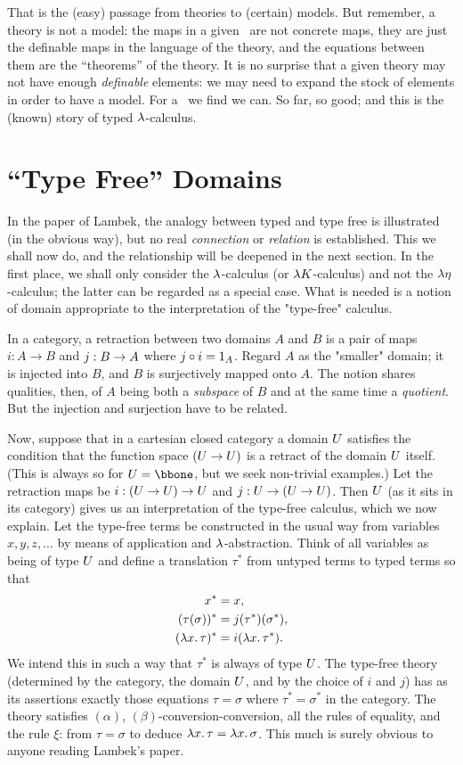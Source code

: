 That is the (easy) passage from theories to (certain) models.
But remember, a theory is not a model: the maps in a given
\ccc\ are not concrete maps, they are just the definable maps in the language of the theory, and the equations between them are the ``theorems'' of the theory. It is no surprise that a given theory may not have enough {\it definable} elements: we may need to expand the stock of elements in order to have a model. For a \ccc\ we find we can. So far, so good; and this is the (known) story of typed $\lambda$-calculus.

\section{``Type Free'' Domains}

In the paper of Lambek, the analogy between typed and type free is illustrated (in the obvious way), but no real {\it connection} or {\it relation} is established. This we shall now do, and the relationship will be deepened in the next section.
In the first place, we shall only consider the $\lambda$-calculus (or $\lambda K$-calculus) and not the $\lambda \eta$-calculus; the latter can be regarded as a special case. What is needed is a notion of domain appropriate to the interpretation of the "type-free" calculus.

In a category, a retraction between two domains $A$ and $B$ is a pair of maps $i: A	\to B$ and $j : B \rightarrow A$ where $j \circ i = {\textrm 1}_A$. Regard $A$ as the "smaller" domain; it is injected into $B$, and $B$ is surjectively mapped onto $A$. The notion shares qualities, then, of $A$ being both a {\it subspace} of $B$ and at the same time a {\it quotient}.
But the injection and surjection have to be related.

Now, suppose that in a cartesian closed category a domain $U$ satisfies the condition that the function space $(U\rightarrow U)$ is a retract of the domain $U$ itself. (This is always so for $\U = \bbone$, but we seek non-trivial examples.) Let the retraction maps be $i: (U \rightarrow U) \rightarrow U$ and $j : U \rightarrow (U \rightarrow U)$. Then $U$ (as it sits in its category) gives us an interpretation of the type-free calculus, which we now explain.
Let the type-free terms be constructed in the usual way from variables $x,y,z, \dots$ by means of application and $\lambda$-abstraction.
Think of all variables as being of type $U$ and define a translation $\tau^*$ from untyped terms to typed terms so that
\begin{align*}
x^* &= x, \\
(\tau(\sigma))^* &= j(\tau^*)(\sigma^*),\\
(\lm{x}.\tau)^* &= i(\lm{x}.\tau^*).
\end{align*}
We intend this in such a way that $\tau^*$ is always of type $U$. The type-free theory (determined by the category, the domain $U$, and by the choice of $i$ and $j$) has as its assertions exactly those equations $\tau = \sigma$ where $\tau^* = \sigma^*$ in the category. The theory satisfies $(\alpha)$, $(\beta)$-conversion-conversion, all the rules of equality, and the rule $\xi$: from $\tau = \sigma$ to deduce $\lambda x .\, \tau = \lambda x .\, \sigma$. This much is surely obvious to anyone reading Lambek's paper.

